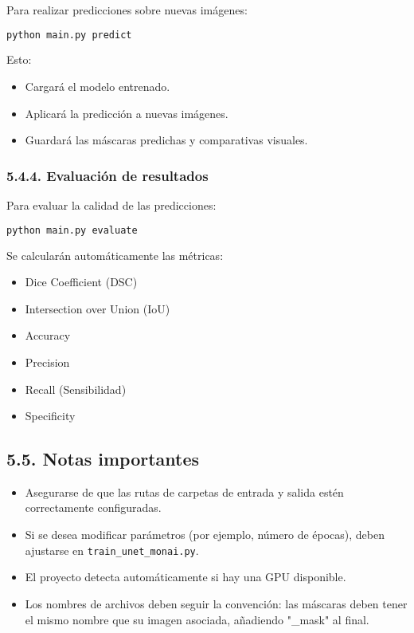\documentclass[12pt]{article}
\begin{document}
Para realizar predicciones sobre nuevas imágenes:

\begin{lstlisting}[language=bash]
python main.py predict
\end{lstlisting}

Esto:
\begin{itemize}
    \item Cargará el modelo entrenado.
    \item Aplicará la predicción a nuevas imágenes.
    \item Guardará las máscaras predichas y comparativas visuales.
\end{itemize}

\subsubsection*{5.4.4. Evaluación de resultados}

Para evaluar la calidad de las predicciones:

\begin{lstlisting}[language=bash]
python main.py evaluate
\end{lstlisting}

Se calcularán automáticamente las métricas:
\begin{itemize}
    \item Dice Coefficient (DSC)
    \item Intersection over Union (IoU)
    \item Accuracy
    \item Precision
    \item Recall (Sensibilidad)
    \item Specificity
\end{itemize}

\subsection*{5.5. Notas importantes}

\begin{itemize}
    \item Asegurarse de que las rutas de carpetas de entrada y salida estén correctamente configuradas.
    \item Si se desea modificar parámetros (por ejemplo, número de épocas), deben ajustarse en \texttt{train\_unet\_monai.py}.
    \item El proyecto detecta automáticamente si hay una GPU disponible.
    \item Los nombres de archivos deben seguir la convención: las máscaras deben tener el mismo nombre que su imagen asociada, añadiendo "\_mask" al final.
\end{itemize}
\end{document}
